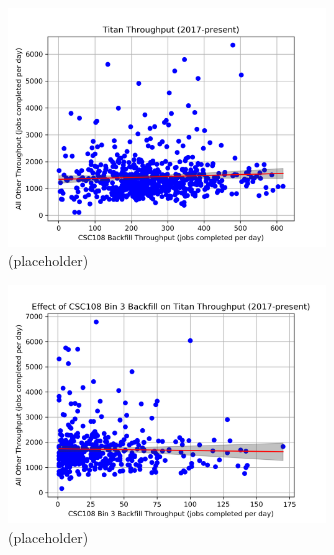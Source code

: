 \begin{figure}
  \includegraphics[width=0.75\textwidth]{images/linfit-throughput-all.png}
\caption{(placeholder)}
\label{fig:throughput-all}
\end{figure}

\begin{figure}
  \includegraphics[width=0.75\textwidth]{images/linfit-throughput-bin3.png}
\caption{(placeholder)}
\label{fig:throughput-bin3}
\end{figure}

